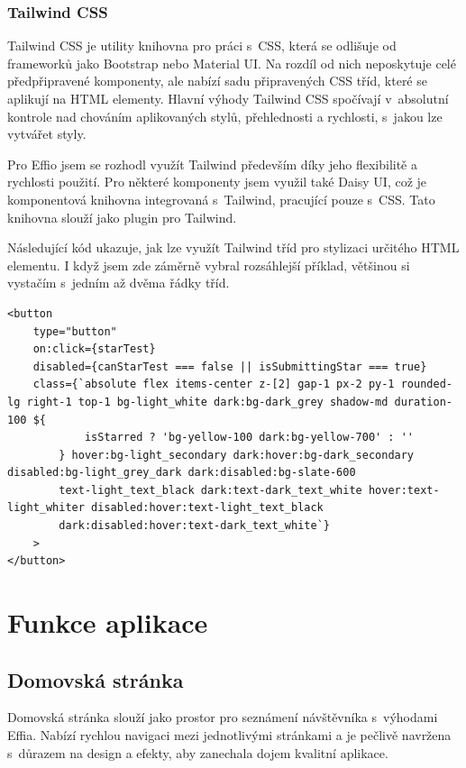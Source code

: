 \documentclass[12pt, a4paper,
openright
]{report}
\let\oldchapter\chapter
\renewcommand{\chapter}{
	\clearpage
	\pagestyle{fancy}
	\oldchapter
}
\begin{document}
\subsection{Tailwind CSS}
Tailwind CSS je utility knihovna pro práci s~CSS, která se odlišuje od frameworků jako Bootstrap nebo Material UI. Na rozdíl od nich neposkytuje celé předpřipravené komponenty, ale nabízí sadu připravených CSS tříd, které se aplikují na HTML elementy. Hlavní výhody Tailwind CSS spočívají v~absolutní kontrole nad chováním aplikovaných stylů, přehlednosti a rychlosti, s~jakou lze vytvářet styly.

Pro Effio jsem se rozhodl využít Tailwind především díky jeho flexibilitě a rychlosti použití. Pro některé komponenty jsem využil také Daisy UI, což je komponentová knihovna integrovaná s~Tailwind, pracující pouze s~CSS. Tato knihovna slouží jako plugin pro Tailwind.

Následující kód ukazuje, jak lze využít Tailwind tříd pro stylizaci určitého HTML elementu. I když jsem zde záměrně vybral rozsáhlejší příklad, většinou si vystačím s~jedním až dvěma řádky tříd.

\begin{lstlisting}[style=ES6, caption=Ukázka Tailwind kódu, label=tailwind-sample]
<button
	type="button"
	on:click={starTest}
	disabled={canStarTest === false || isSubmittingStar === true}
	class={`absolute flex items-center z-[2] gap-1 px-2 py-1 rounded-lg right-1 top-1 bg-light_white dark:bg-dark_grey shadow-md duration-100 ${
			isStarred ? 'bg-yellow-100 dark:bg-yellow-700' : ''
		} hover:bg-light_secondary dark:hover:bg-dark_secondary disabled:bg-light_grey_dark dark:disabled:bg-slate-600
		text-light_text_black dark:text-dark_text_white hover:text-light_whiter disabled:hover:text-light_text_black
		dark:disabled:hover:text-dark_text_white`}
	>
</button>
\end{lstlisting}

\chapter{Funkce aplikace}

\section{Domovská stránka}
Domovská stránka slouží jako prostor pro seznámení návštěvníka s~výhodami Effia. Nabízí rychlou navigaci mezi jednotlivými stránkami a je pečlivě navržena s~důrazem na design a efekty, aby zanechala dojem kvalitní aplikace.
\end{document}
